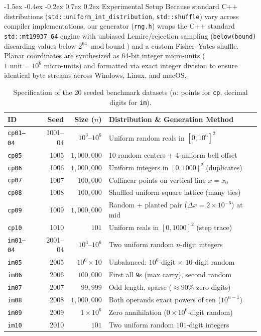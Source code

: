 \documentclass[10pt,twocolumn]{article}
\makeatletter
\renewcommand\section{\@startsection{section}{1}{\z@}%
  {-1.5ex \@plus -0.4ex \@minus -0.2ex}%
  {0.7ex \@plus 0.2ex}%
  {\normalfont\normalsize\bfseries}}
\makeatother
\begin{document}
\section{Experimental Setup}
Because standard C++ distributions (\texttt{std::uniform\_int\_distribution}, \texttt{std::shuffle}) vary across compiler implementations, our generator (\texttt{rng.h}) wraps the C++ standard \texttt{std::mt19937\_64} engine \cite{matsumoto1998mersenne} with unbiased Lemire/rejection sampling (\texttt{below(bound)} discarding values below $2^{64} \bmod \text{bound}$) and a custom Fisher--Yates shuffle. Planar coordinates are synthesized as 64-bit integer micro-units ($1\text{ unit} = 10^6\text{ micro-units}$) and formatted via exact integer division to ensure identical byte streams across Windows, Linux, and macOS.

\begin{table}[t]
\centering
\caption{Specification of the 20 seeded benchmark datasets ($n$: points for \texttt{cp}, decimal digits for \texttt{im}).}
\label{tab:datasets}
\scriptsize
\setlength{\tabcolsep}{3.2pt}
\begin{tabularx}{\columnwidth}{@{}lrrX@{}}
\toprule
\textbf{ID} & \textbf{Seed} & \textbf{Size ($n$)} & \textbf{Distribution \& Generation Method} \\
\midrule
\texttt{cp01--04} & 1001--04 & $10^3$--$10^6$ & Uniform random reals in $[0, 10^6]^2$ \\
\texttt{cp05} & 1005 & $1{,}000{,}000$ & 10 random centers + 4-uniform bell offset \\
\texttt{cp06} & 1006 & $1{,}000{,}000$ & Uniform integers in $[0, 1000]^2$ (duplicates) \\
\texttt{cp07} & 1007 & $100{,}000$ & Collinear points on vertical line $x = x_0$ \\
\texttt{cp08} & 1008 & $100{,}000$ & Shuffled uniform square lattice (many ties) \\
\texttt{cp09} & 1009 & $1{,}000{,}000$ & Random + planted pair ($\Delta x = 2\times 10^{-6}$) at mid \\
\texttt{cp10} & 1010 & $101$ & Uniform reals in $[0, 1000]^2$ (step trace) \\
\midrule
\texttt{im01--04} & 2001--04 & $10^3$--$10^6$ & Two uniform random $n$-digit integers \\
\texttt{im05} & 2005 & $10^6 \times 10$ & Unbalanced: $10^6$-digit $\times$ $10$-digit random \\
\texttt{im06} & 2006 & $100{,}000$ & First all \texttt{9}s (max carry), second random \\
\texttt{im07} & 2007 & $99{,}999$ & Odd length, sparse ($\approx 90\%$ zero digits) \\
\texttt{im08} & 2008 & $1{,}000{,}000$ & Both operands exact powers of ten ($10^{n-1}$) \\
\texttt{im09} & 2009 & $1 \times 10^6$ & Zero annihilation ($0 \times 10^6$-digit random) \\
\texttt{im10} & 2010 & $101$ & Two uniform random $101$-digit integers \\
\bottomrule
\end{tabularx}
\vspace{-0.7em}
\end{table}
\end{document}
